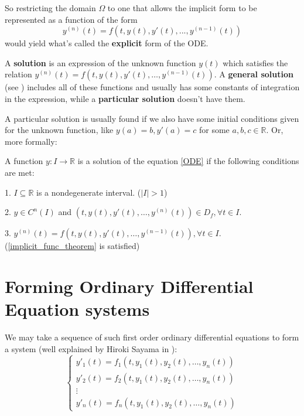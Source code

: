 So restricting the domain $\Omega$ to one that allows the implicit form to be represented as a function of the form
\begin{equation}\label{implicit_func_theorem}
	y^{(n)}(t)=f(t,y(t),y'(t),...,y^{(n-1)}(t))
\end{equation}
would yield what's called the \textbf{explicit} form of the ODE.

A \textbf{solution} is an expression of the unknown function $y(t)$ which satisfies the relation
$y^{(n)}(t) = f(t,y(t),y'(t),\dots,y^{(n-1)}(t))$. A \textbf{general solution} (see \cite{maryland2022}) includes all of these functions and usually has some constants of integration in the expression, while a \textbf{particular solution} doesn't have them.

A particular solution is usually found if we also have some initial conditions given for the unknown function, like $y(a)=b, y'(a)=c$ for some $a,b,c \in \mathbb{R}$.
Or, more formally:

\begin{definition}
	A function $y:I \rightarrow \mathbb{R}$ is a solution of the equation \ref{ODE} if the following conditions are met:

	1. $I \subseteq \mathbb{R}$ is a nondegenerate interval. ($|I|>1$)

	2. $y \in C^n(I)$ and $(t,y(t), y'(t), \dots, y^{(n)}(t)) \in D_f, \forall t \in I$.

	3. $y^{(n)}(t)= f(t,y(t),y'(t),\dots,y^{ (n-1) }(t)), \forall t \in I$. (\ref{implicit_func_theorem} is satisfied)

\end{definition}

\section{Forming Ordinary Differential Equation systems}
We may take a sequence of such first order ordinary differential equations to form a system (well explained by Hiroki Sayama in \cite{Hiroki2015}):
\begin{equation}\label{eq:ode-sys}
	\begin{cases}
		y'_1(t) = f_1(t,y_1(t),y_2(t),\dots,y_n(t)) \\
		y'_2(t) = f_2(t,y_1(t),y_2(t),\dots,y_n(t)) \\
		\vdots                                      \\
		y'_n(t) = f_n(t,y_1(t),y_2(t),\dots,y_n(t))
	\end{cases}
\end{equation}

